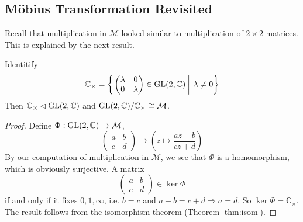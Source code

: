 \documentclass[10pt, a4paper, twoside]{report}
\begin{document}
\subsection{Möbius Transformation Revisited}
Recall that multiplication in \(\mathcal{M}\) looked similar to multiplication of \(2\times 2\) matrices. This is explained by the next result.
\begin{proposition}
    Identitify 
    \[\mathbb{C}_\times=\left\{\left.\begin{pmatrix}
        \lambda & 0 \\ 0 & \lambda
    \end{pmatrix}\in\operatorname{GL}(2,\mathbb{C})\:\right|\:\lambda\neq 0\right\}\]
    Then \(\mathbb{C}_\times\lhd\operatorname{GL}(2,\mathbb{C})\) and \(\operatorname{GL}(2,\mathbb{C})/\mathbb{C}_\times\cong\mathcal{M}\).
\end{proposition}
\begin{proof}
    Define \(\Phi:\operatorname{GL}(2,\mathbb{C})\to\mathcal{M}\), 
    \[\begin{pmatrix}
        a & b \\ c & d
    \end{pmatrix}\mapsto\left(z\mapsto\frac{az+b}{cz+d}\right)\]
    By our computation of multiplication in \(\mathcal{M}\), we see that \(\Phi\) is a homomorphism, which is obviously surjective. A matrix 
    \[\begin{pmatrix}
        a & b \\ c & d
    \end{pmatrix}\in\ker\Phi\]
    if and only if it fixes \(0,1,\infty\), i.e. \(b=c\) and \(a+b=c+d\Rightarrow a=d\). So \(\ker\Phi=\mathbb{C}_\times\). The result follows from the isomorphism theorem (Theorem \ref{thm:isom}).
\end{proof}
\end{document}
